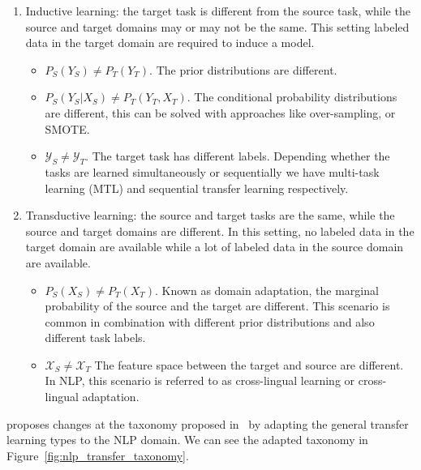 \begin{enumerate}[a -]
    \item Inductive learning: the target task is different from the source task, while the source and target domains may or may not be the same. This setting labeled data in the target domain are required to induce a model.
        \begin{itemize}[- ]
            \item $P_S(Y_S) \neq P_T(Y_T)$. The prior distributions are different. 
            \item $P_S(Y_S | X_S) \neq P_T(Y_T, X_T)$. The conditional probability distributions are different, this can be solved with approaches like over-sampling, or SMOTE.
            \item $\mathcal{Y}_S \neq \mathcal{Y}_T$. The target task has different labels. Depending whether the tasks are learned simultaneously or sequentially we have multi-task learning (MTL) and sequential transfer learning respectively.  
        \end{itemize}
    
    \item Transductive learning: the source and target tasks are the same, while the source and target domains are different. In this setting, no labeled data in the target domain are available while a lot of labeled data in the source domain are available.
        \begin{itemize}[- ]
            \item $P_S(X_S) \neq P_T(X_T)$. Known as domain adaptation, the marginal probability of the source and the target are different. This scenario is common in combination with different prior distributions and also different task labels.
            \item $\mathcal{X}_S \neq \mathcal{X}_T$ The feature space between the target and source are different. In NLP, this scenario is referred to as cross-lingual learning or cross-lingual adaptation.
        \end{itemize}

\end{enumerate}

\citet{ruder2019neural} proposes changes at the taxonomy proposed in~\citet{pan2010transfer} by adapting the general transfer learning types to the NLP domain. We can see the adapted taxonomy in Figure~\ref{fig:nlp_transfer_taxonomy}.

